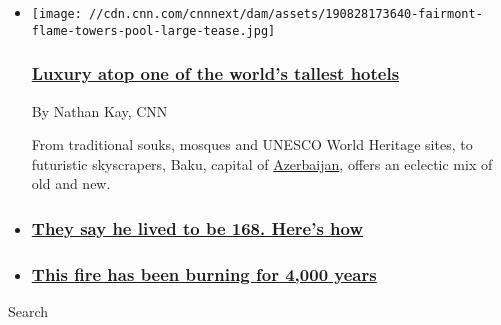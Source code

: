 \begin{itemize}
\item
  \href{/travel/article/fairmont-baku-flame-towers-azerbaijan/index.html}{}

  \texttt{[image: //cdn.cnn.com/cnnnext/dam/assets/190828173640-fairmont-flame-towers-pool-large-tease.jpg]}

  \hypertarget{luxury-atop-one-of-the-worlds-tallest-hotels}{%
  \subsubsection{\texorpdfstring{\href{/travel/article/fairmont-baku-flame-towers-azerbaijan/index.html}{Luxury
  atop one of the world's tallest
  hotels}}{Luxury atop one of the world's tallest hotels}}\label{luxury-atop-one-of-the-worlds-tallest-hotels}}

  By Nathan Kay, CNN

  From traditional souks, mosques and UNESCO World Heritage sites, to
  futuristic skyscrapers, Baku, capital of
  \href{https://cnn.com/travel/destinations/azerbaijan}{Azerbaijan},
  offers an eclectic mix of old and new.
\item
  \hypertarget{they-say-he-lived-to-be-168-heres-how}{%
  \subsubsection{\texorpdfstring{\href{/travel/article/long-life-lerik-azerbaijan-wellness/index.html}{They
  say he lived to be 168. Here's
  how}}{They say he lived to be 168. Here's how}}\label{they-say-he-lived-to-be-168-heres-how}}
\item
  \hypertarget{this-fire-has-been-burning-for-4000-years}{%
  \subsubsection{\texorpdfstring{\href{/travel/article/yanar-dag-azerbaijan-land-of-fire/index.html}{This
  fire has been burning for 4,000
  years}}{This fire has been burning for 4,000 years}}\label{this-fire-has-been-burning-for-4000-years}}
\end{itemize}

Search

